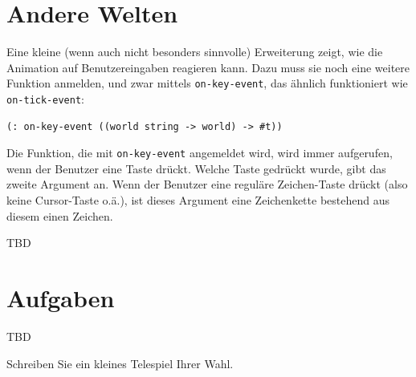 \section{Andere Welten}

Eine kleine (wenn auch nicht besonders sinnvolle) Erweiterung zeigt,
wie die Animation auf Benutzereingaben reagieren kann.  Dazu muss sie
noch eine weitere Funktion anmelden, und zwar mittels
\texttt{on-key-event}, das
ähnlich funktioniert wie \texttt{on-tick-event}:
%
\begin{lstlisting}
(: on-key-event ((world string -> world) -> #t))
\end{lstlisting}
%
Die Funktion, die mit \texttt{on-key-event} angemeldet wird, wird
immer aufgerufen, wenn der Benutzer eine Taste drückt.  Welche Taste
gedrückt wurde, gibt das zweite Argument 
an.  Wenn der Benutzer eine reguläre Zeichen-Taste drückt (also keine
Cursor-Taste o.ä.), ist dieses Argument eine Zeichenkette bestehend
aus diesem einen Zeichen.

TBD

\section*{Aufgaben}

TBD

\begin{aufgabe}
  Schreiben Sie ein kleines Telespiel Ihrer Wahl.
\end{aufgabe}


